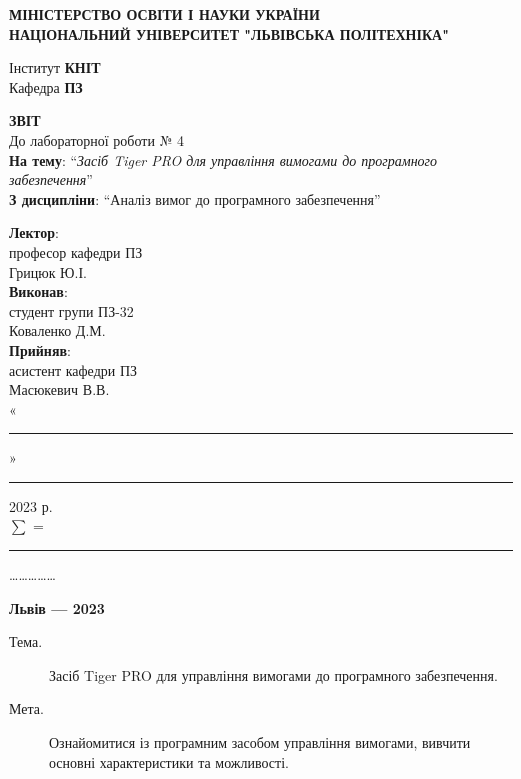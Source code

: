 \documentclass[14pt]{extreport}
\newcommand\subject{Аналіз вимог до програмного забезпечення}
\newcommand\lecturer{професор кафедри ПЗ\\Грицюк Ю.І.}
\newcommand\teacher{асистент кафедри ПЗ\\Масюкевич В.В.}
\newcommand\mygroup{ПЗ-32}
\newcommand\lab{4}
\newcommand\theme{Засіб Tiger PRO для управління вимогами до програмного забезпечення}
\newcommand\purpose{Ознайомитися із програмним засобом управління вимогами,
	вивчити основні характеристики та можливості}
\begin{document}
\begin{normalsize}
	\begin{titlepage}
		\thispagestyle{empty}
		\begin{center}
			\textbf{МІНІСТЕРСТВО ОСВІТИ І НАУКИ УКРАЇНИ\\
				НАЦІОНАЛЬНИЙ УНІВЕРСИТЕТ "ЛЬВІВСЬКА ПОЛІТЕХНІКА"}
		\end{center}
		\begin{flushright}
			Інститут \textbf{КНІТ}\\
			Кафедра \textbf{ПЗ}
		\end{flushright}
		\vspace{140pt}
		\begin{center}
			\textbf{ЗВІТ}\\
			\vspace{10pt}
			До лабораторної роботи № \lab\\
			\textbf{На тему}: “\textit{\theme}”\\
			\textbf{З дисципліни}: “\subject”
		\end{center}
		\vspace{40pt}
		\begin{flushright}
			
			\textbf{Лектор}:\\
			\lecturer\\
			\vspace{10pt}
			\textbf{Виконав}:\\
			
			студент групи \mygroup\\
			Коваленко Д.М.\\
			\vspace{10pt}
			\textbf{Прийняв}:\\
			
			\teacher\\
			
			\vspace{28pt}
			«\rule{1cm}{0.15mm}» \rule{1.5cm}{0.15mm} 2023 р.\\
			$\sum$ = \rule{1cm}{0.15mm}……………\\
			
		\end{flushright}
		\vspace{\fill}
		\begin{center}
			\textbf{Львів — 2023}
		\end{center}
	\end{titlepage}
		
	\begin{description}
		\item[Тема.] \theme.
		\item[Мета.] \purpose.
	\end{description}


\end{normalsize}
\end{document}
